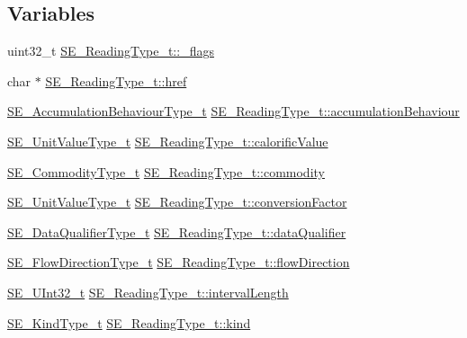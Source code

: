 \subsection*{Variables}
\begin{DoxyCompactItemize}
\item 
uint32\+\_\+t \hyperlink{group__ReadingType_ga0b47ada65894fa1e36bc0d185d21a71d}{S\+E\+\_\+\+Reading\+Type\+\_\+t\+::\+\_\+flags}
\item 
char $\ast$ \hyperlink{group__ReadingType_gaab72122e2abf41553e43032788338e3e}{S\+E\+\_\+\+Reading\+Type\+\_\+t\+::href}
\item 
\hyperlink{group__AccumulationBehaviourType_gaa25de69f43be64dff9ec0bdf3ef685d2}{S\+E\+\_\+\+Accumulation\+Behaviour\+Type\+\_\+t} \hyperlink{group__ReadingType_ga4ed3a5e9fe3ab6c2ea585504d1d6a239}{S\+E\+\_\+\+Reading\+Type\+\_\+t\+::accumulation\+Behaviour}
\item 
\hyperlink{structSE__UnitValueType__t}{S\+E\+\_\+\+Unit\+Value\+Type\+\_\+t} \hyperlink{group__ReadingType_ga57e12f39f9ed0fcdb2a9b83dab5b3e2f}{S\+E\+\_\+\+Reading\+Type\+\_\+t\+::calorific\+Value}
\item 
\hyperlink{group__CommodityType_ga8c7268080f04fe151221243d3c68eb8c}{S\+E\+\_\+\+Commodity\+Type\+\_\+t} \hyperlink{group__ReadingType_gac70ce0c79f4a38a96aa90aa1843907c1}{S\+E\+\_\+\+Reading\+Type\+\_\+t\+::commodity}
\item 
\hyperlink{structSE__UnitValueType__t}{S\+E\+\_\+\+Unit\+Value\+Type\+\_\+t} \hyperlink{group__ReadingType_ga479e0031bba268429db70bbcb9f4ef2d}{S\+E\+\_\+\+Reading\+Type\+\_\+t\+::conversion\+Factor}
\item 
\hyperlink{group__DataQualifierType_gad1c718c173804210c9562a1ef63a9bf6}{S\+E\+\_\+\+Data\+Qualifier\+Type\+\_\+t} \hyperlink{group__ReadingType_gac7db2fdae63614e7fd7e738071012fa7}{S\+E\+\_\+\+Reading\+Type\+\_\+t\+::data\+Qualifier}
\item 
\hyperlink{group__FlowDirectionType_ga83b9e4bedc8eaad2a4210b0dab7be48e}{S\+E\+\_\+\+Flow\+Direction\+Type\+\_\+t} \hyperlink{group__ReadingType_ga13cc7653b3ac0633618440d2ad240aa0}{S\+E\+\_\+\+Reading\+Type\+\_\+t\+::flow\+Direction}
\item 
\hyperlink{group__UInt32_ga70bd4ecda3c0c85d20779d685a270cdb}{S\+E\+\_\+\+U\+Int32\+\_\+t} \hyperlink{group__ReadingType_ga27fb2c72d4c94d8e2b9ddd66ac40b089}{S\+E\+\_\+\+Reading\+Type\+\_\+t\+::interval\+Length}
\item 
\hyperlink{group__KindType_gaaa33b4be52e2f2c6decfbdcb8d4edc21}{S\+E\+\_\+\+Kind\+Type\+\_\+t} \hyperlink{group__ReadingType_ga9b4451c6dfbfd971677fe48371e3190c}{S\+E\+\_\+\+Reading\+Type\+\_\+t\+::kind}

\end{DoxyCompactItemize}
